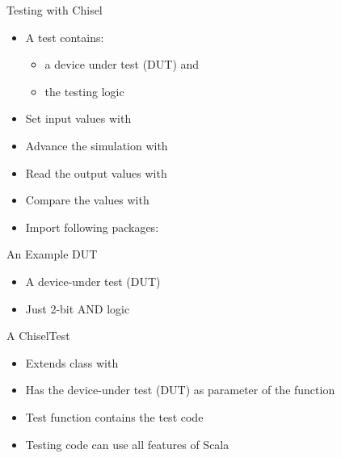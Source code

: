 

\begin{frame}[fragile]{Testing with Chisel}
\begin{itemize}
\item A test contains:
\begin{itemize}
\item a device under test (DUT) and
\item the testing logic
\end{itemize}
\item Set input values with 
\item Advance the simulation with 
\item Read the output values with 
\item Compare the values with 
\item Import following packages:
\end{itemize}
\end{frame}

\begin{frame}[fragile]{An Example DUT}
\begin{itemize}
\item A device-under test (DUT)
\item Just 2-bit AND logic
\end{itemize}
\end{frame}

\begin{frame}[fragile]{A ChiselTest}
\begin{itemize}
\item Extends class  with 
\item Has the device-under test (DUT) as parameter of the  function
\item Test function contains the test code
\item Testing code can use all features of Scala
\end{itemize}
\end{frame}

